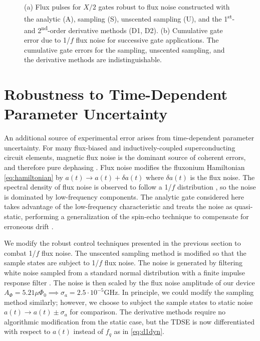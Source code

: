 \documentclass[
  amsfonts,
  amsmath,
  amssymb,
  pra,
  twocolumn,
  superscriptaddress,
]{revtex4-2}
\begin{document}
\begin{figure}[ht]
\begin{subfigure}{.4\textwidth}
        \caption{}
    \label{fig:stochasticb}
  \end{subfigure}
  \caption{
    (a) Flux pulses for $X/2$ gates robust to flux noise
    constructed with the analytic (A),
    sampling (S), unscented sampling (U), and the 1\textsuperscript{st}-
    and 2\textsuperscript{nd}-order derivative methods (D1, D2).
    (b) Cumulative gate error due to 1/$f$ flux noise for
    successive gate applications. The cumulative gate errors for the
    sampling, unscented sampling, and the derivative methods are indistinguishable.
  }
  \label{fig:stochastic}
\end{figure}


\section{Robustness to Time-Dependent Parameter Uncertainty \label{sec:stochastic}}
An additional source of experimental error arises from time-dependent
parameter uncertainty. For many flux-biased and inductively-coupled
superconducting circuit elements, magnetic flux noise is the dominant
source of coherent errors, and therefore pure dephasing \cite{bialczak20071f, kakuyanagi2007dephasing,
  kumar2016origin, yoshihara2006decoherence}. Flux noise
modifies the fluxonium Hamiltonian \eqref{eq:hamiltonian}
by $a(t) \rightarrow a(t) + \delta a(t)$ where $\delta a(t)$ is the flux noise.
The spectral density of flux noise is observed to
follow a 1/$f$ distribution
\cite{bialczak20071f, koch2007model, kakuyanagi2007dephasing,
  kumar2016origin, yoshihara2006decoherence, yoshihara2010correlated,
  zhang2020universal},
so the noise is dominated by low-frequency components.
The analytic gate considered here
takes advantage of the low-frequency characteristic and
treats the noise as quasi-static, performing a generalization of the spin-echo
technique to compensate for erroneous drift \cite{hahn1952spin, meiboom1958modified}.

We modify the robust control techniques presented
in the previous section to combat 1/$f$ flux noise.
The unscented sampling method is modified so that the sample states
are subject to 1/$f$ flux noise. The noise
is generated by filtering white noise sampled from a standard
normal distribution with a finite impulse response filter \cite{saspweb2011}.
The noise is then scaled by the 
flux noise amplitude of our device $A_{\Phi} = 5.21 \mu \Phi_{0} \implies
\sigma_{a} = 2.5 \cdot 10^{-5} \textrm{GHz}$.
In principle, we could modify the sampling method
similarly; however, we choose to subject the sample states
to static noise
$a(t) \rightarrow a(t) \pm \sigma_{a}$
for comparison. The derivative methods require no algorithmic modification
from the static case, but the TDSE is now differentiated with respect
to $a(t)$ instead of $f_{q}$ as in \eqref{eq:d1dyn}.
\end{document}

